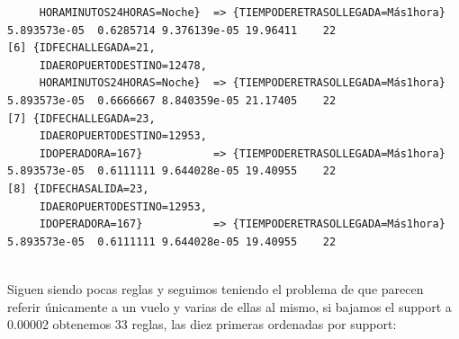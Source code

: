 \documentclass{article}
\begin{document}
\begin{lstlisting}
     HORAMINUTOS24HORAS=Noche}  => {TIEMPODERETRASOLLEGADA=Más1hora} 5.893573e-05  0.6285714 9.376139e-05 19.96411    22
[6] {IDFECHALLEGADA=21,                                                                                                 
     IDAEROPUERTODESTINO=12478,                                                                                         
     HORAMINUTOS24HORAS=Noche}  => {TIEMPODERETRASOLLEGADA=Más1hora} 5.893573e-05  0.6666667 8.840359e-05 21.17405    22
[7] {IDFECHALLEGADA=23,                                                                                                 
     IDAEROPUERTODESTINO=12953,                                                                                         
     IDOPERADORA=167}           => {TIEMPODERETRASOLLEGADA=Más1hora} 5.893573e-05  0.6111111 9.644028e-05 19.40955    22
[8] {IDFECHASALIDA=23,                                                                                                  
     IDAEROPUERTODESTINO=12953,                                                                                         
     IDOPERADORA=167}           => {TIEMPODERETRASOLLEGADA=Más1hora} 5.893573e-05  0.6111111 9.644028e-05 19.40955    22
     
\end{lstlisting}
Siguen siendo pocas reglas y seguimos teniendo el problema de que parecen referir únicamente a un vuelo y varias de ellas al mismo, si bajamos el support a 0.00002 obtenemos 33 reglas, las diez primeras ordenadas por support:
\end{document}
